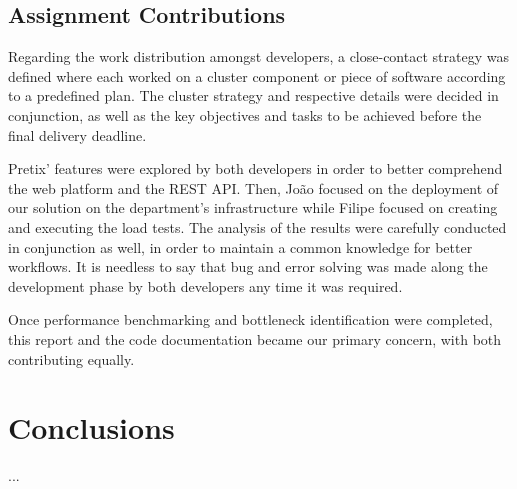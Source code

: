 \documentclass[12pt]{article}
\begin{document}
\subsection{Assignment Contributions} \label{remarks.contributions} %


Regarding the work distribution amongst developers, a close-contact strategy was defined where each worked on a cluster component or piece of software according 
to a predefined plan. 
The cluster strategy and respective details were decided in conjunction, as well as the key objectives and tasks to be achieved before the final delivery deadline.

Pretix' features were explored by both developers in order to better comprehend the web platform and the REST API.
Then, João focused on the deployment of our solution on the department's infrastructure while Filipe focused on creating and executing the load tests.
The analysis of the results were carefully conducted in conjunction as well, in order to maintain a common knowledge for better workflows.
It is needless to say that bug and error solving was made along the development phase by both developers any time it was required.

Once performance benchmarking and bottleneck identification were completed, this report and the code documentation became our primary concern, with both 
contributing equally.

\newpage
\section*{Conclusions} \label{conclusions} %

...
\end{document}
